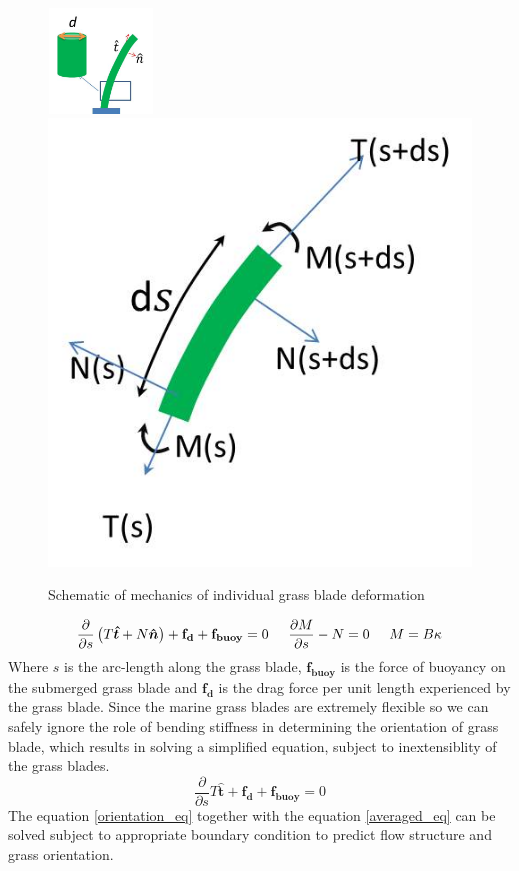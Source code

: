 \documentclass[12pt]{report}   %
\newcommand{\bn}{{\boldsymbol{\hat{n}}}}
\newcommand{\bt}{{\boldsymbol{\hat{t}}}}
\begin{document}
\begin{figure}
 \centerline{\includegraphics[width=2.8cm, height = 2.8cm]{Grass_mod1}\hspace{2.5cm} \includegraphics[width=3.cm,height=3.cm]{Grass_mod2}}
 \caption{Schematic of mechanics of individual grass blade deformation}
 \label{grass_blade_deformation}
\end{figure}
\begin{equation}
 \frac{\partial}{\partial s}\left( T\bt + N\bn \right)+\mathbf{f_d}+\mathbf{f_{buoy}} =0 \hspace{.5cm} \frac{\partial M}{\partial s} -N =0 \hspace{.5cm}  M = B\kappa
\end{equation}
Where $s$ is the arc-length along the grass blade, $\mathbf{f_{buoy}}$ is the force of buoyancy on the submerged grass blade and $\mathbf{f_{d}}$ is the drag force per unit length experienced by the grass blade. Since the marine grass blades are extremely flexible so we can safely ignore the role of bending stiffness in determining the orientation of grass blade,  which results in solving a simplified equation, subject to inextensiblity of the grass blades. 
\begin{equation}
  \frac{\partial}{\partial s} T\bt +\mathbf{f_d}+\mathbf{f_{buoy}} =0
  \label{orientation_eq}
\end{equation}
The equation \eqref{orientation_eq} together with the equation \eqref{averaged_eq} can be solved subject to appropriate boundary condition to predict flow structure and grass orientation.
\end{document}
